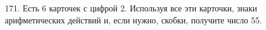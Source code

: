 171. Есть 6 карточек с цифрой 2. Используя все эти карточки, знаки арифметических действий и, если нужно, скобки, получите число 55.\\

